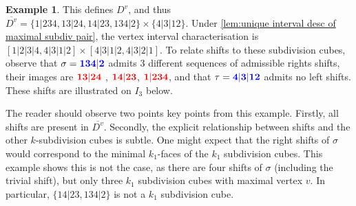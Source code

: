 \documentclass{amsart}
\newcommand{\red}{\color{red}} %
\newcommand{\blue}{\color{blue}} %
\theoremstyle{definition}
\newtheorem{example}[theorem]{Example}
\newcommand{\subdivpairsv}{D^v}
\newcommand{\maxsubdivpairsv}{\overline{D^v}}
\begin{document}
\begin{example}
This defines $\subdivpairsv$, and thus $\maxsubdivpairsv=\{ 1|234, 13|24, 14|23, 134|2\} \times \{4|3|12\}$.
Under \cref{lem:unique interval desc of maximal subdiv pair}, the vertex interval characterisation is $[1|2|3|4, 4|3|1|2] \times [4|3|1|2, 4|3|2|1]$.
To relate shifts to these subdivision cubes, observe that $\sigma = \blue{\mathbf{134|2}}$ admits $3$ different sequences of admissible rights shifts, their images are $\red{\mathbf{13|24}}$ , $\red{\mathbf{14|23}}$, $\red{\mathbf{1|234}}$,
and that $\tau = \blue{\mathbf{4|3|12}}$ admits no left shifts.
These shifts are illustrated on $I_3$ below.
\begin{center}
{\small
{}
}
\end{center}

The reader should observe two points key  points from this example.
Firstly, all shifts are present in $\maxsubdivpairsv$.
Secondly, the explicit relationship between shifts and the other $k$-subdivision cubes is subtle.
One might expect that the right shifts of $\sigma$ would correspond to the minimal $k_1$-faces of the $k_1$ subdivision cubes.
This example shows this is not the case, as there are four shifts of $\sigma$ (including the trivial shift), but only three $k_1$ subdivision cubes with maximal vertex $v$.
In particular, $\{14|23, 134|2\}$ is not a $k_1$ subdivision cube.

\end{example}
\end{document}
